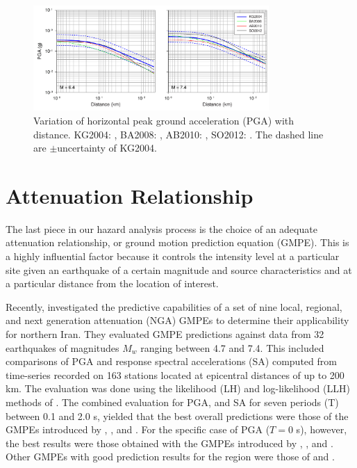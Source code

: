 
\begin{figure}[t]
    \centering
    \includegraphics[width=0.8\textwidth]{figures/pdf/figure-08}
    \caption{Variation of horizontal peak ground acceleration (PGA) with distance. KG2004: \citet{Kalkan2004}, BA2008: \citet{Boore2008}, AB2010: \citet{Akkar2010}, SO2012: \citet{Soghrat2012}. The dashed line are $\pm$uncertainty of KG2004.}
    \label{fig:att}
\end{figure}

\section{Attenuation Relationship}

The last piece in our hazard analysis process is the choice of an adequate attenuation relationship, or ground motion prediction equation (GMPE). This is a highly influential factor because it controls the intensity level at a particular site given an earthquake of a certain magnitude and source characteristics and at a particular distance from the location of interest.

Recently, \citet{Zafarani2014} investigated the predictive capabilities of a set of nine local, regional, and next generation attenuation (NGA) GMPEs to determine their applicability for northern Iran. They evaluated GMPE predictions against data from 32 earthquakes of magnitudes $M_w$ ranging between 4.7 and 7.4. This included comparisons of PGA and response spectral accelerations (SA) computed from time-series recorded on 163 stations located at epicentral distances of up to 200 km. The evaluation was done using the likelihood (LH) and log-likelihood (LLH) methods of \citet{Scherbaum_2004_BSSA, Scherbaum_2009_BSSA}. The combined evaluation for PGA, and SA for seven periods (T) between 0.1 and 2.0 s, yielded that the best overall predictions were those of the GMPEs introduced by \citet{Ghasemi_2009_JS}, \citet{Abrahamson_2008_ES}, and \citet{Chiou2008}. For the specific case of PGA ($T = 0$ s), however, the best results were those obtained with the GMPEs introduced by \citet{Kalkan2004}, \citet{Chiou2008}, and \citet{Boore2008}. Other GMPEs with good prediction results for the region were those of \citet{Soghrat2012} and \citet{Akkar2010}.

